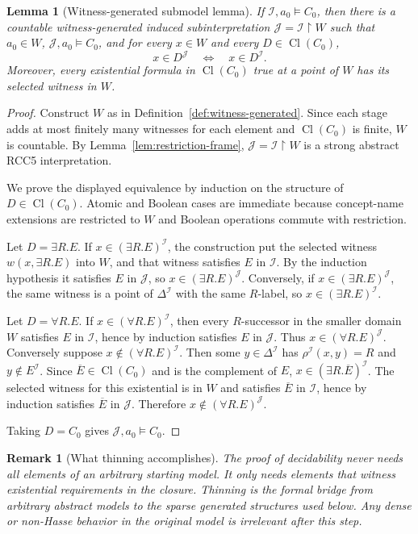\documentclass[11pt]{article}
\newtheorem{lemma}[theorem]{Lemma}
\newtheorem{remark}[theorem]{Remark}
\newcommand{\Cl}{\operatorname{Cl}}
\newcommand{\I}{\mathcal I}
\newcommand{\J}{\mathcal J}
\begin{document}
\begin{lemma}[Witness-generated submodel lemma]\label{lem:thinning}
If $\I,a_0\models C_0$, then there is a countable witness-generated induced subinterpretation $\J=\I\upharpoonright W$ such that $a_0\in W$, $\J,a_0\models C_0$, and for every $x\in W$ and every $D\in\Cl(C_0)$,
\[
   x\in D^\J \quad\Longleftrightarrow\quad x\in D^\I.
\]
Moreover, every existential formula in $\Cl(C_0)$ true at a point of $W$ has its selected witness in $W$.
\end{lemma}

\begin{proof}
Construct $W$ as in Definition~\ref{def:witness-generated}.  Since each stage adds at most finitely many witnesses for each element and $\Cl(C_0)$ is finite, $W$ is countable.  By Lemma~\ref{lem:restriction-frame}, $\J=\I\upharpoonright W$ is a strong abstract RCC5 interpretation.

We prove the displayed equivalence by induction on the structure of $D\in\Cl(C_0)$.  Atomic and Boolean cases are immediate because concept-name extensions are restricted to $W$ and Boolean operations commute with restriction.

Let $D=\exists R.E$.  If $x\in(\exists R.E)^\I$, the construction put the selected witness $w(x,\exists R.E)$ into $W$, and that witness satisfies $E$ in $\I$.  By the induction hypothesis it satisfies $E$ in $\J$, so $x\in(\exists R.E)^\J$.  Conversely, if $x\in(\exists R.E)^\J$, the same witness is a point of $\Delta^\I$ with the same $R$-label, so $x\in(\exists R.E)^\I$.

Let $D=\forall R.E$.  If $x\in(\forall R.E)^\I$, then every $R$-successor in the smaller domain $W$ satisfies $E$ in $\I$, hence by induction satisfies $E$ in $\J$.  Thus $x\in(\forall R.E)^\J$.  Conversely suppose $x\notin(\forall R.E)^\I$.  Then some $y\in\Delta^\I$ has $\rho^\I(x,y)=R$ and $y\notin E^\I$.  Since $\overline E\in\Cl(C_0)$ and is the complement of $E$, $x\in(\exists R.\overline E)^\I$.  The selected witness for this existential is in $W$ and satisfies $\overline E$ in $\I$, hence by induction satisfies $\overline E$ in $\J$.  Therefore $x\notin(\forall R.E)^\J$.

Taking $D=C_0$ gives $\J,a_0\models C_0$.
\end{proof}

\begin{remark}[What thinning accomplishes]
The proof of decidability never needs all elements of an arbitrary starting model.  It only needs elements that witness existential requirements in the closure.  Thinning is the formal bridge from arbitrary abstract models to the sparse generated structures used below.  Any dense or non-Hasse behavior in the original model is irrelevant after this step.
\end{remark}
\end{document}
